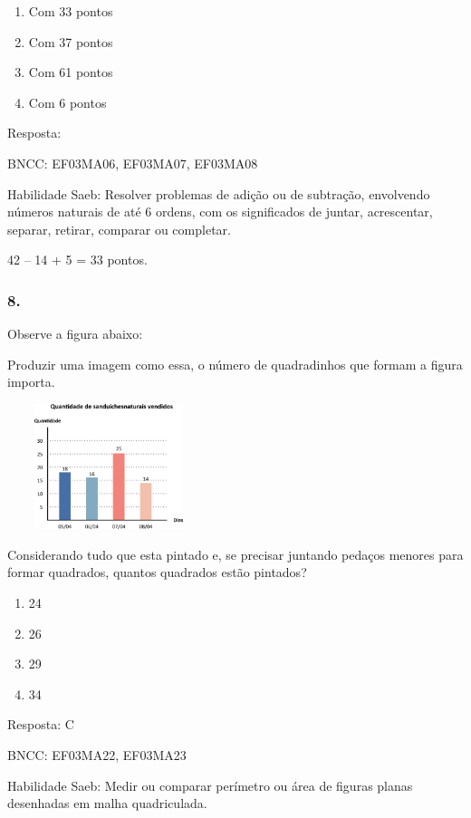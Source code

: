 \begin{enumerate}
\def\labelenumi{\alph{enumi})}
\item
  Com 33 pontos
\item
  Com 37 pontos
\item
  Com 61 pontos
\item
  Com 6 pontos
\end{enumerate}

Resposta:

BNCC: EF03MA06, EF03MA07, EF03MA08

Habilidade Saeb: Resolver problemas de adição ou de subtração,
envolvendo números naturais de até 6 ordens, com os significados de
juntar, acrescentar, separar, retirar, comparar ou completar.

42 -- 14 + 5 = 33 pontos.

\subsubsection{8.}\label{section-133}

Observe a figura abaixo:

Produzir uma imagem como essa, o número de quadradinhos que formam a
figura importa.

\includegraphics[width=2.32692in,height=1.43990in]{media/image109.png}

Considerando tudo que esta pintado e, se precisar juntando pedaços
menores para formar quadrados, quantos quadrados estão pintados?

\begin{enumerate}
\def\labelenumi{\alph{enumi})}
\item
  24
\item
  26
\item
  29
\item
  34
\end{enumerate}

Resposta: C

BNCC: EF03MA22, EF03MA23

Habilidade Saeb: Medir ou comparar perímetro ou área de figuras planas
desenhadas em malha quadriculada.

